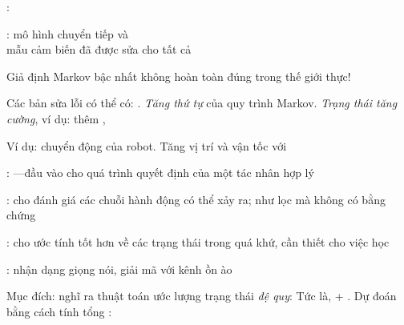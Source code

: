 \documentclass{article}
\begin{document}
\begin{huge}
\textwidth
{}

: 

: mô hình chuyển tiếp  và \\
mẫu cảm biến  đã được sửa cho tất cả 




\vspace*{0.2in}

\textwidth
{}

Giả định Markov bậc nhất không hoàn toàn đúng trong thế giới thực!

Các bản sửa lỗi có thể có: . \emph{Tăng thứ tự} của quy trình Markov. \emph{Trạng thái tăng cường}, ví dụ: thêm , 

Ví dụ: chuyển động của robot. \al
  Tăng vị trí và vận tốc với 



: \al
  ---đầu vào cho quá trình quyết định của một tác nhân hợp lý

:  cho \al
  đánh giá các chuỗi hành động có thể xảy ra;\al
  như lọc mà không có bằng chứng

:  cho \al
  ước tính tốt hơn về các trạng thái trong quá khứ, cần thiết cho việc học

: \al
  nhận dạng giọng nói, giải mã với kênh ồn ào


Mục đích: nghĩ ra thuật toán ước lượng trạng thái \emph{đệ quy}:
\mat{\[
  \pv(\X_{t+1}|\e_{1:t+1}) = f(\e_{t+1},\pv(\X_t|\e_{1:t}))
\]}
Tức là,  + . Dự đoán bằng cách tính tổng :


\end{huge}
\end{document}
